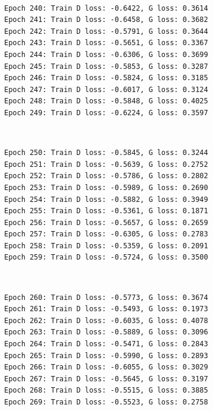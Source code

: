\documentclass[11pt]{article}
\begin{document}
    \begin{center}
    \end{center}
    { \hspace*{\fill} \\}
    
    \begin{Verbatim}[commandchars=\\\{\}]
Epoch 240: Train D loss: -0.6422, G loss: 0.3614
Epoch 241: Train D loss: -0.6458, G loss: 0.3682
Epoch 242: Train D loss: -0.5791, G loss: 0.3644
Epoch 243: Train D loss: -0.5651, G loss: 0.3367
Epoch 244: Train D loss: -0.6306, G loss: 0.3699
Epoch 245: Train D loss: -0.5853, G loss: 0.3287
Epoch 246: Train D loss: -0.5824, G loss: 0.3185
Epoch 247: Train D loss: -0.6017, G loss: 0.3124
Epoch 248: Train D loss: -0.5848, G loss: 0.4025
Epoch 249: Train D loss: -0.6224, G loss: 0.3597

    \end{Verbatim}

    \begin{center}
    \end{center}
    { \hspace*{\fill} \\}
    
    \begin{Verbatim}[commandchars=\\\{\}]
Epoch 250: Train D loss: -0.5845, G loss: 0.3244
Epoch 251: Train D loss: -0.5639, G loss: 0.2752
Epoch 252: Train D loss: -0.5786, G loss: 0.2802
Epoch 253: Train D loss: -0.5989, G loss: 0.2690
Epoch 254: Train D loss: -0.5882, G loss: 0.3949
Epoch 255: Train D loss: -0.5361, G loss: 0.1871
Epoch 256: Train D loss: -0.5657, G loss: 0.2659
Epoch 257: Train D loss: -0.6305, G loss: 0.2783
Epoch 258: Train D loss: -0.5359, G loss: 0.2091
Epoch 259: Train D loss: -0.5724, G loss: 0.3500

    \end{Verbatim}

    \begin{center}
    \end{center}
    { \hspace*{\fill} \\}
    
    \begin{Verbatim}[commandchars=\\\{\}]
Epoch 260: Train D loss: -0.5773, G loss: 0.3674
Epoch 261: Train D loss: -0.5493, G loss: 0.1973
Epoch 262: Train D loss: -0.6035, G loss: 0.4078
Epoch 263: Train D loss: -0.5889, G loss: 0.3096
Epoch 264: Train D loss: -0.5471, G loss: 0.2843
Epoch 265: Train D loss: -0.5990, G loss: 0.2893
Epoch 266: Train D loss: -0.6055, G loss: 0.3029
Epoch 267: Train D loss: -0.5645, G loss: 0.3197
Epoch 268: Train D loss: -0.5515, G loss: 0.3885
Epoch 269: Train D loss: -0.5523, G loss: 0.2758

    \end{Verbatim}
\end{document}
